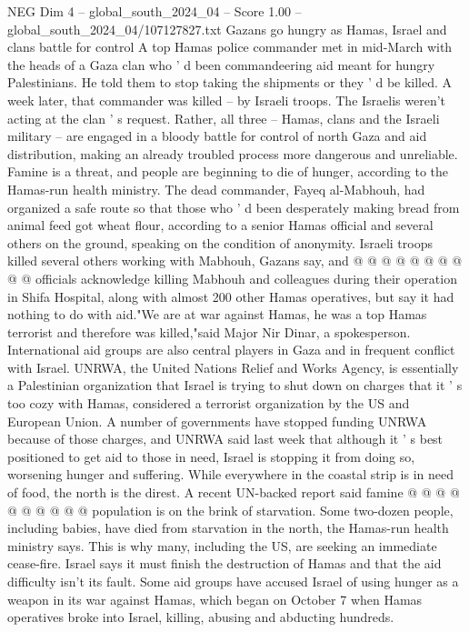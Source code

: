 \begin{textsample}{NEG Dim 4 – global\_south\_2024\_04 – Score 1.00 – global\_south\_2024\_04/107127827.txt}  \label{ex:f4_neg_198}
Gazans go hungry as Hamas, Israel and clans battle for control A top Hamas police commander met in mid-March with the heads of a Gaza clan who ' d been commandeering aid meant for hungry Palestinians.
He told them to stop taking the shipments or they ' d be killed.
A week later, that commander was killed -- by Israeli troops.
The Israelis weren't acting at the clan ' s request.
Rather, all three -- Hamas, clans and the Israeli military -- are engaged in a bloody battle for control of north Gaza and aid distribution, making an already troubled process more dangerous and unreliable.
Famine is a threat, and people are beginning to die of hunger, according to the Hamas-run health ministry.
The dead commander, Fayeq al-Mabhouh, had organized a safe route so that those who ' d been desperately making bread from animal feed got wheat flour, according to a senior Hamas official and several others on the ground, speaking on the condition of anonymity.
Israeli troops killed several others working with Mabhouh, Gazans say, and @ @ @ @ @ @ @ @ @ @ officials acknowledge killing Mabhouh and colleagues during their operation in Shifa Hospital, along with almost 200 other Hamas operatives, but say it had nothing to do with aid."We are at war against Hamas, he was a top Hamas terrorist and therefore was killed,"said Major Nir Dinar, a spokesperson.
International aid groups are also central players in Gaza and in frequent conflict with Israel.
UNRWA, the United Nations Relief and Works Agency, is essentially a Palestinian organization that Israel is trying to shut down on charges that it ' s too cozy with Hamas, considered a terrorist organization by the US and European Union.
A number of governments have stopped funding UNRWA because of those charges, and UNRWA said last week that although it ' s best positioned to get aid to those in need, Israel is stopping it from doing so, worsening hunger and suffering.
While everywhere in the coastal strip is in need of food, the north is the direst.
A recent UN-backed report said famine @ @ @ @ @ @ @ @ @ @ population is on the brink of starvation.
Some two-dozen people, including babies, have died from starvation in the north, the Hamas-run health ministry says.
This is why many, including the US, are seeking an immediate cease-fire.
Israel says it must finish the destruction of Hamas and that the aid difficulty isn't its fault.
Some aid groups have accused Israel of using hunger as a weapon in its war against Hamas, which began on October 7 when Hamas operatives broke into Israel, killing, abusing and abducting hundreds.

\end{textsample}

